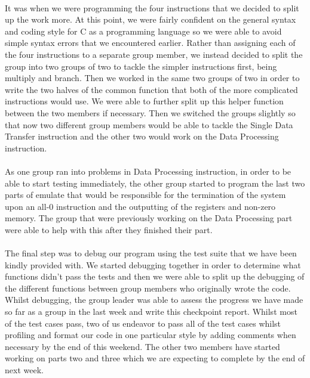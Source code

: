 \documentclass[11pt]{article}
\begin{document}
\paragraph{}
It was when we were programming the four instructions that we decided to split up the work more. At this point, we were fairly confident on the general syntax and coding style for C as a programming language so we were able to avoid simple syntax errors that we encountered earlier.  Rather than assigning each of the four instructions to a separate group member, we instead decided to split the group into two groups of two to tackle the simpler instructions first, being multiply and branch. Then we worked in the same two groups of two in order to write the two halves of the common function that both of the more complicated instructions would use. We were able to further split up this helper function between the two members if necessary. Then we switched the groups slightly so that now two different group members would be able to tackle the Single Data Transfer instruction and the other two would work on the Data Processing instruction. 
\paragraph{}
As one group ran into problems in Data Processing instruction, in order to be able to start testing immediately, the other group started to program the last two parts of emulate that would be responsible for the termination of the system upon an all-0 instruction and the outputting of the registers and non-zero memory. The group that were previously working on the Data Processing part were able to help with this after they finished their part.
\paragraph{}
The final step was to debug our program using the test suite that we have been kindly provided with. We started debugging together in order to determine what functions didn't pass the tests and then we were able to split up the debugging of the different functions between group members who originally wrote the code. Whilst debugging, the group leader was able to assess the progress we have made so far as a group in the last week and write this checkpoint report. Whilst most of the test cases pass, two of us endeavor to pass all of the test cases whilst profiling and format our code in one particular style by adding comments when necessary by the end of this weekend. The other two members have started working on parts two and three which we are expecting to complete by the end of next week. 
\end{document}
